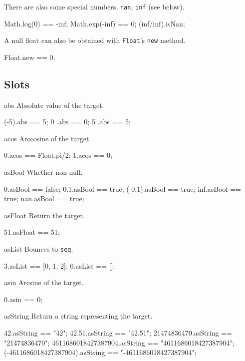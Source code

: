 There are also some special numbers, \lstinline|nan|, \lstinline|inf|
(see below).

\begin{urbiassert}
Math.log(0) == -inf;
Math.exp(-inf) == 0;
(inf/inf).isNan;
\end{urbiassert}

A null float can also be obtained with \lstinline|Float|'s
\lstinline|new| method.

\begin{urbiassert}
Float.new == 0;
\end{urbiassert}

\subsection{Slots}

\begin{urbiscriptapi}
\item[abs]
  Absolute value of the target.
\begin{urbiassert}
(-5).abs == 5;
  0 .abs == 0;
  5 .abs == 5;
\end{urbiassert}

\item[acos]
  Arccosine of the target.
\begin{urbiassert}
0.acos == Float.pi/2;
1.acos == 0;
\end{urbiassert}

\item[asBool]
  Whether non null.
\begin{urbiassert}
0.asBool == false;
0.1.asBool == true;
(-0.1).asBool == true;
inf.asBool == true;
nan.asBool == true;
\end{urbiassert}

\item[asFloat]
  Return the target.
\begin{urbiassert}
51.asFloat == 51;
\end{urbiassert}

\item[asList]
  Bounces to \lstinline|seq|.
\begin{urbiassert}
3.asList == [0, 1, 2];
0.asList == [];
\end{urbiassert}

\item[asin]
  Arcsine of the target.
\begin{urbiassert}
0.asin == 0;
\end{urbiassert}

\item[asString]
  Return a string representing the target.
\begin{urbiassert}
                    42.asString == "42";
                 42.51.asString == "42.51";
           21474836470.asString == "21474836470";
   4611686018427387904.asString == "4611686018427387904";
(-4611686018427387904).asString == "-4611686018427387904";
\end{urbiassert}


\end{urbiscriptapi}
